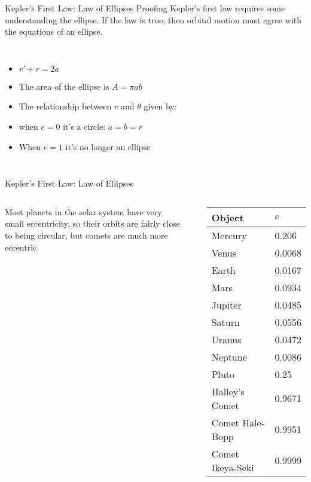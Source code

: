 \documentclass[12pt,compress,aspectratio=169]{beamer}
\begin{document}
\begin{frame}{Kepler's First Law: Law of Ellipses}
  Proofing Kepler's first law requires some understanding the ellipse. If
  the law is true, then orbital motion must agree with the equations of an
  ellipse.
  \begin{columns}
    \centering

    \begin{itemize}
    \item $r' + r =2a$
    \item The area of the ellipse is $A=\pi ab$
    \item The relationship between $r$ and $\theta$ given by:

    \item when $e=0$ it's a circle: $a=b=r$
    \item When $e=1$ it's no longer an ellipse
    \end{itemize}
  \end{columns}
\end{frame}



\begin{frame}{Kepler's First Law: Law of Ellipses}
  \begin{columns}
    Most planets in the solar system have very small eccentricity, so their
    orbits are fairly close to being circular, but comets are much more
    eccentric
    \begin{center}
    \end{center}
    
    \begin{tabular}{l|l}
      \rowcolor{pink}
      \textbf{Object} & $e$ \\ \hline
      Mercury	& \num{.206} \\
      Venus	& \num{.0068} \\
      Earth	& \num{.0167} \\
      Mars	& \num{.0934} \\
      Jupiter	& \num{.0485} \\
      Saturn	& \num{.0556} \\
      Uranus	& \num{.0472} \\
      Neptune	& \num{.0086} \\
      Pluto	& \num{.25} \\ \hline
      Halley's Comet   & \num{.9671} \\
      Comet Hale-Bopp  & \num{.9951} \\
      Comet Ikeya-Seki & \num{.9999}
    \end{tabular}
  \end{columns}
\end{frame}
\end{document}
